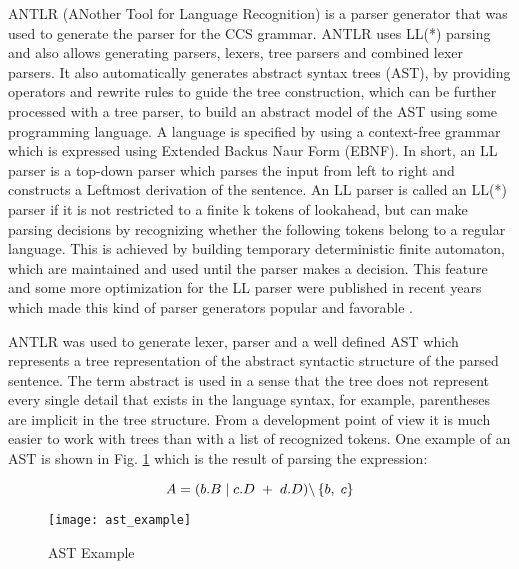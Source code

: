 ANTLR (ANother Tool for Language Recognition) \cite{ANTLRRef} is a parser generator that was used 
to generate the parser for the CCS grammar. ANTLR uses LL(*) parsing and also allows generating 
parsers, lexers, tree parsers and combined lexer parsers. It also automatically generates 
abstract syntax trees (AST), by providing operators and rewrite rules to guide the tree construction,
which can be further processed with a tree parser, to build an abstract model of the AST using some programming language.
A language is specified by using a context-free
grammar which is expressed using Extended Backus Naur Form (EBNF). In short, an LL parser is a 
top-down parser which parses the input from left to right and constructs a Leftmost derivation 
of the sentence. An LL parser is called an LL(*) parser if it is not restricted to a finite k 
tokens of lookahead, but can make parsing decisions by recognizing whether the following tokens
belong to a regular language. This is achieved by building temporary deterministic finite
automaton, which are maintained and used until the parser makes a decision. This feature and
some more optimization for the LL parser were published in recent years which made this kind 
of parser generators popular and favorable \cite{NiklausWirth}.

ANTLR was used to generate lexer, parser and a well defined AST which represents a tree representation 
of the abstract syntactic structure of the parsed sentence. The term abstract is used in a sense 
that the tree does not represent every single detail that exists in the language syntax, 
for example, parentheses are implicit in the tree structure. 
From a development point of view it is much easier to work with trees than with a list of recognized
tokens. One example of an AST is shown in  Fig. \ref{fig:ast_example} which is the result of parsing the expression: 

\begin{equation}\label{eq:ccs_example}
 A=( b.B \hspace{1 mm} | \hspace{1 mm} c.D \hspace{1 mm} + \hspace{1 mm} d.D )
\backslash \left\lbrace b, \hspace{1 mm} c \right\rbrace 
\end{equation}

\begin{figure}[!t]
\centering
\texttt{[image: ast\_example]}
\caption{AST Example}
\label{fig:ast_example}
\end{figure}

